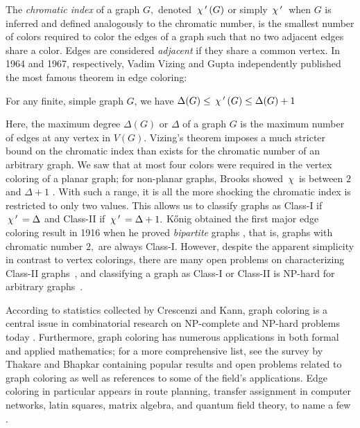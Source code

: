 The \textit{chromatic index} of a graph $G,$ denoted $\,\chi\,'\,(G)$ or simply $\,\chi\,'\,$ when $G$ is inferred and defined analogously to the chromatic number, is the smallest number of colors required to color the edges of a graph such that no two adjacent edges share a color. Edges are considered \textit{adjacent} if they share a common vertex. In 1964 and 1967, respectively, Vadim Vizing\cite{VizingProof} and Gupta\cite{Gupta} independently published the most famous theorem in edge coloring:
\begin{theorem}\label{Vizing} 
    For any finite, simple graph $G$, we have $\Delta(G) \leq \,\chi\,'\,(G) \leq \Delta(G)+1$
\end{theorem}
Here, the maximum degree $\Delta(G)$ or $\Delta$ of a graph $G$ is the maximum number of edges at any vertex in $V(G)$. Vizing's theorem imposes a much stricter bound on the chromatic index than exists for the chromatic number of an arbitrary graph. We saw that at most four colors were required in the vertex coloring of a planar graph; for non-planar graphs, Brooks showed $\,\chi\,$ is between $2$ and $\Delta + 1$ \cite{chromatic_number}. With such a range, it is all the more shocking the chromatic index is restricted to only two values. This allows us to classify graphs as Class-I if $\,\chi\,'\, = \Delta$ and Class-II if $\,\chi\,'\, = \Delta+1.$  K\H{o}nig obtained the first major edge coloring result in 1916 when he proved \textit{bipartite} graphs \cite{konig}, that is, graphs with chromatic number $2,$ are always Class-I. However, despite the apparent simplicity in contrast to vertex colorings, there are many open problems on characterizing Class-II graphs~\cite{class2}, and classifying a graph as Class-I or Class-II is NP-hard for arbitrary graphs~\cite{Ian}.

According to statistics collected by Crescenzi and Kann, graph coloring is a central issue in combinatorial research on NP-complete and NP-hard problems today \cite{NPStats}. Furthermore, graph coloring has numerous applications in both formal and applied mathematics; for a more comprehensive list, see the survey by Thakare and Bhapkar \cite{Survey} containing popular results and open problems related to graph coloring as well as references to some of the field's applications. Edge coloring in particular appears in route planning, transfer assignment in computer networks, latin squares, matrix algebra, and quantum field theory, to name a few \cite{random_app, LatinSquareCameron, LatinSquareHilton, chinesepost, bigSurvey}.

